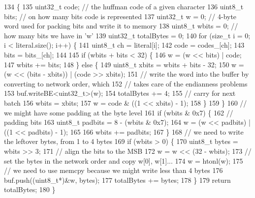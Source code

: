 \begin{DoxyCode}
134                                                            \{
135   uint32\_t code;  \textcolor{comment}{// the huffman code of a given character}
136   uint8\_t bits;   \textcolor{comment}{// on how many bits code is represented}
137   uint32\_t w = 0; \textcolor{comment}{// 4-byte word used for packing bits and write it to memory}
138   uint8\_t wbits = 0;  \textcolor{comment}{// how many bits we have in 'w'}
139   uint32\_t totalBytes = 0;
140   \textcolor{keywordflow}{for} (\textcolor{keywordtype}{size\_t} i = 0; i < literal.size(); i++) \{
141     uint8\_t ch = literal[i];
142     code = codes_[ch];
143     bits = bits_[ch];
144 
145     \textcolor{keywordflow}{if} (wbits + bits < 32) \{
146       w = (w << bits) | code;
147       wbits += bits;
148     \} \textcolor{keywordflow}{else} \{
149       uint8\_t xbits = wbits + bits - 32;
150       w = (w << (bits - xbits)) | (code >> xbits);
151       \textcolor{comment}{// write the word into the buffer by converting to network order, which}
152       \textcolor{comment}{// takes care of the endianness problems}
153       buf.writeBE<uint32\_t>(w);
154       totalBytes += 4;
155       \textcolor{comment}{// carry for next batch}
156       wbits = xbits;
157       w = code & ((1 << xbits) - 1);
158     \}
159   \}
160   \textcolor{comment}{// we might have some padding at the byte level}
161   \textcolor{keywordflow}{if} (wbits & 0x7) \{
162     \textcolor{comment}{// padding bits}
163     uint8\_t padbits = 8 - (wbits & 0x7);
164     w = (w << padbits) | ((1 << padbits) - 1);
165 
166     wbits += padbits;
167   \}
168   \textcolor{comment}{// we need to write the leftover bytes, from 1 to 4 bytes}
169   \textcolor{keywordflow}{if} (wbits > 0) \{
170     uint8\_t bytes = wbits >> 3;
171     \textcolor{comment}{// align the bits to the MSB}
172     w = w << (32 - wbits);
173     \textcolor{comment}{// set the bytes in the network order and copy w[0], w[1]...}
174     w = htonl(w);
175     \textcolor{comment}{// we need to use memcpy because we might write less than 4 bytes}
176     buf.push((uint8\_t*)&w, bytes);
177     totalBytes += bytes;
178   \}
179   \textcolor{keywordflow}{return} totalBytes;
180 \}
\end{DoxyCode}
